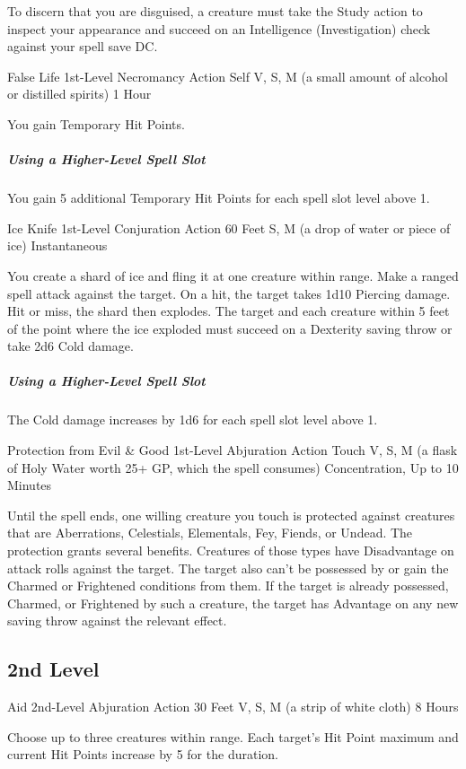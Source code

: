 \documentclass[letterpaper,openany,oneside,twocolumn]{book}
\begin{document}
To discern that you are disguised, a creature must take the Study action to inspect your appearance and succeed on an Intelligence (Investigation) check against your spell save DC.

\DndSpellHeader
  {False Life}
  {1st-Level Necromancy}
  {Action}
  {Self}
  {V, S, M (a small amount of alcohol or distilled spirits)}
  {1 Hour}

You gain  Temporary Hit Points.

\subparagraph*{Using a Higher-Level Spell Slot} You gain 5 additional Temporary Hit Points for each spell slot level above 1.

\DndSpellHeader
  {Ice Knife}
  {1st-Level Conjuration}
  {Action}
  {60 Feet}
  {S, M (a drop of water or piece of ice)}
  {Instantaneous}

You create a shard of ice and fling it at one creature within range. Make a ranged spell attack against the target. On a hit, the target takes 1d10 Piercing damage. Hit or miss, the shard then explodes. The target and each creature within 5 feet of the point where the ice exploded must succeed on a Dexterity saving throw or take 2d6 Cold damage.

\subparagraph*{Using a Higher-Level Spell Slot} The Cold damage increases by 1d6 for each spell slot level above 1.

\DndSpellHeader
  {Protection from Evil \& Good}
  {1st-Level Abjuration}
  {Action}
  {Touch}
  {V, S, M (a flask of Holy Water worth 25+ GP, which the spell consumes)}
  {Concentration, Up to 10 Minutes}

Until the spell ends, one willing creature you touch is protected against creatures that are Aberrations, Celestials, Elementals, Fey, Fiends, or Undead. The protection grants several benefits. Creatures of those types have Disadvantage on attack rolls against the target. The target also can't be possessed by or gain the Charmed or Frightened conditions from them. If the target is already possessed, Charmed, or Frightened by such a creature, the target has Advantage on any new saving throw against the relevant effect.

\subsection*{2nd Level}

\DndSpellHeader
  {Aid}
  {2nd-Level Abjuration}
  {Action}
  {30 Feet}
  {V, S, M (a strip of white cloth)}
  {8 Hours}

Choose up to three creatures within range. Each target's Hit Point maximum and current Hit Points increase by 5 for the duration.
\end{document}
